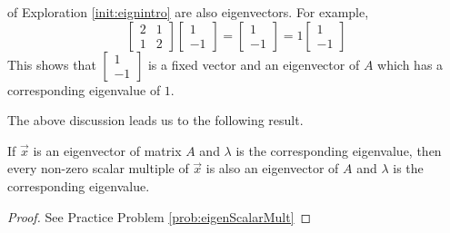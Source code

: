 \documentclass{ximera}
\begin{document}
\begin{center}
\end{center}

 of Exploration \ref{init:eignintro} are also eigenvectors. 
For example,  
$$\begin{bmatrix} 2& 1\\ 1&2 \end{bmatrix} \begin{bmatrix} 1\\ -1 \end{bmatrix} =
\begin{bmatrix} 1\\ -1 \end{bmatrix}= 1 \begin{bmatrix} 1\\ -1 \end{bmatrix}$$
This shows that $\begin{bmatrix} 1\\ -1 \end{bmatrix}$ is a fixed vector and an eigenvector of $A$ which has a corresponding eigenvalue of $1$.

The above discussion leads us to the following result.

\begin{theorem}\label{th:eigenScalarMult}
    If $\vec{x}$ is an eigenvector of matrix $A$ and $\lambda$ is the corresponding eigenvalue, then every non-zero scalar multiple of $\vec{x}$ is also an eigenvector of $A$ 
 and $\lambda$ is the corresponding eigenvalue.
\end{theorem}
\begin{proof}
See Practice Problem \ref{prob:eigenScalarMult}
\end{proof}
\end{document}
